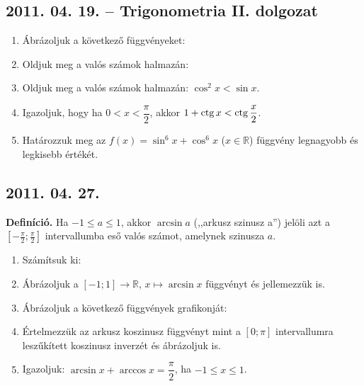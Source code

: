\subsection*{2011. 04. 19. -- Trigonometria II. dolgozat}
\begin{enumerate}
\item Ábrázoljuk a következő függvényeket:
\item Oldjuk meg a valós számok halmazán:
\item Oldjuk meg a valós számok halmazán: $\cos^2 x<\sin x$.
\item Igazoljuk, hogy ha $0<x<\dfrac{\pi}{2}$, akkor $1+\mathop{\mathrm{ctg}}\nolimits x<\mathop{\mathrm{ctg}}\nolimits\dfrac{x}{2}$.
\item Határozzuk meg az $f(x)=\sin^6 x+\cos^6 x$ ($x\in\mathbb R$) függvény legnagyobb és legkisebb értékét.
\end{enumerate}

\subsection*{2011. 04. 27.}
\textbf{Definíció.} Ha $-1\le a\le 1$, akkor $\arcsin a$ (,,arkusz szinusz a'') jelöli azt a $\left[-\frac{\pi}{2};\frac{\pi}{2}\right]$ intervallumba eső valós számot, amelynek szinusza $a$.
\begin{enumerate}
\item Számítsuk ki:
\item Ábrázoljuk a $[-1;1]\to\mathbb R$, $x\mapsto \arcsin x$ függvényt és jellemezzük is.
\item Ábrázoljuk a következő függvények grafikonját:
\item Értelmezzük az arkusz koszinusz függvényt mint a $[0;\pi]$ intervallumra leszűkített koszinusz inverzét és ábrázoljuk is.
\item Igazoljuk: $\arcsin x+\arccos x=\dfrac{\pi}{2}$, ha $-1\le x\le 1$.
\end{enumerate}

